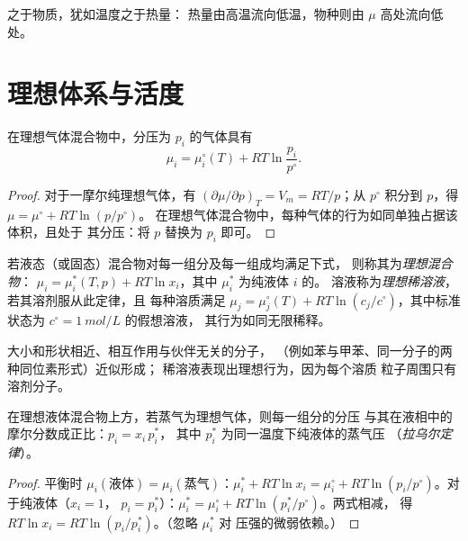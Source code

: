 之于物质，犹如温度之于热量：
热量由高温流向低温，物种则由 $\mu$ 高处流向低处。

\section{理想体系与活度}

\begin{proposition}[理想气体的化学势]\label{prop:b2:chemical-potential:mu-gas}
在理想气体混合物中，分压为 $p_i$ 的气体具有
\[
  \mu_i = \mu_i^\circ(T) + RT\ln\frac{p_i}{p^\circ} .
\]
\end{proposition}

\begin{proof}
对于一摩尔纯理想气体，有 $(\partial\mu/\partial p)_T = V_m =
RT/p$；从 $p^\circ$ 积分到 $p$，得 $\mu = \mu^\circ + RT\ln(p/p^\circ)$。
在理想气体混合物中，每种气体的行为如同单独占据该体积，且处于
其分压：将 $p$ 替换为 $p_i$ 即可。
\end{proof}

\begin{definition}\label{def:b2:chemical-potential:ideal-mixture}
若液态（或固态）混合物对每一组分及每一组成均满足下式，
则称其为\emph{理想混合物}：
$\mu_i = \mu_i^*(T, p) + RT\ln x_i$，其中 $\mu_i^*$ 为纯液体 $i$ 的。
溶液称为\emph{理想稀溶液}，若其溶剂服从此定律，且
每种溶质满足
$\mu_j = \mu_j^\circ(T) + RT\ln(c_j/c^\circ)$，其中标准状态为
$c^\circ = \qty{1}{mol/L}$ 的假想溶液，
其行为如同无限稀释。
\end{definition}

大小和形状相近、相互作用与伙伴无关的分子，
（例如苯与甲苯、同一分子的两种同位素形式）近似形成；
稀溶液表现出理想行为，因为每个溶质
粒子周围只有溶剂分子。

\begin{theorem}[拉乌尔定律]\label{thm:b2:chemical-potential:raoult}
在理想液体混合物上方，若蒸气为理想气体，则每一组分的分压
与其在液相中的摩尔分数成正比：$p_i = x_i\,p_i^*$，
其中 $p_i^*$ 为同一温度下纯液体的蒸气压
（\emph{拉乌尔定律}）。
\end{theorem}

\begin{proof}
平衡时 $\mu_i(\text{液体}) = \mu_i(\text{蒸气})$：$\mu_i^* +
RT\ln x_i = \mu_i^\circ + RT\ln(p_i/p^\circ)$。对于纯液体（$x_i = 1$，
$p_i = p_i^*$）：$\mu_i^* = \mu_i^\circ + RT\ln(p_i^*/p^\circ)$。两式相减，
得 $RT\ln x_i = RT\ln(p_i/p_i^*)$。（忽略 $\mu_i^*$ 对
压强的微弱依赖。）
\end{proof}

